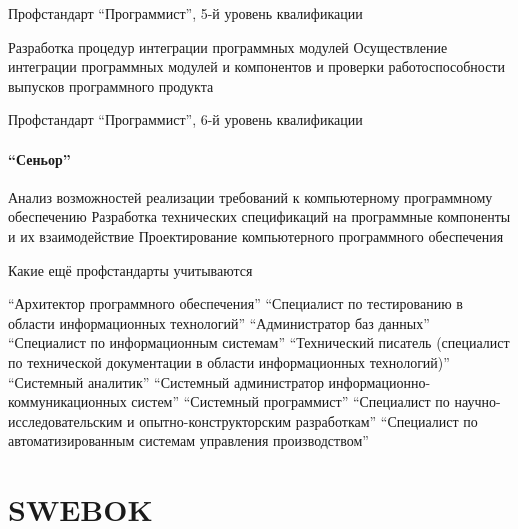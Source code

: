 \documentclass{../../slides-style}
\begin{document}
    \begin{frame}{Профстандарт \enquote{Программист}, 5-й уровень квалификации}
        \begin{outline}
            \1 Разработка процедур интеграции программных модулей
            \1 Осуществление интеграции программных модулей и компонентов и проверки работоспособности выпусков программного продукта
        \end{outline}
    \end{frame}

    \begin{frame}{Профстандарт \enquote{Программист}, 6-й уровень квалификации}
        \framesubtitle{\enquote{Сеньор}}
        \begin{outline}
            \1 Анализ возможностей реализации требований к компьютерному программному обеспечению
            \1 Разработка технических спецификаций на программные компоненты и их взаимодействие
            \1 Проектирование компьютерного программного обеспечения
        \end{outline}
    \end{frame}

    \begin{frame}{Какие ещё профстандарты учитываются}
        \begin{footnotesize}
            \begin{outline}
                 \enquote{Архитектор программного обеспечения}
                 \enquote{Специалист по тестированию в области информационных технологий}
                 \enquote{Администратор баз данных}
                 \enquote{Специалист по информационным системам}
                 \enquote{Технический писатель (специалист по технической документации в области информационных технологий)}
                 \enquote{Системный аналитик}
                 \enquote{Системный администратор информационно-коммуникационных систем}
                 \enquote{Системный программист}
                 \enquote{Специалист по научно-исследовательским и опытно-конструкторским разработкам}
                 \enquote{Специалист по автоматизированным системам управления производством}
            \end{outline}
        \end{footnotesize}
    \end{frame}

    \section{SWEBOK}
\end{document}
